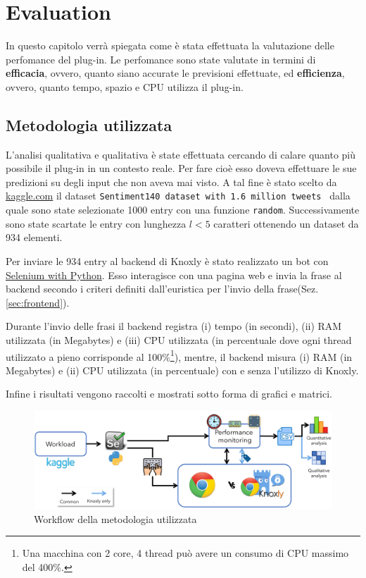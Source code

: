 \chapter{Evaluation}
\label{ch:cap6}
In questo capitolo verrà spiegata come è stata effettuata la valutazione delle perfomance del plug-in. Le perfomance sono state valutate in termini di \textbf{efficacia}, ovvero, quanto siano accurate le previsioni effettuate, ed \textbf{efficienza}, ovvero, quanto tempo, spazio e CPU utilizza il plug-in.   

\section{Metodologia utilizzata}
\label{sec:metodologiaevaluation}
L'analisi qualitativa e qualitativa è state effettuata cercando di calare quanto più possibile il plug-in in un contesto reale. Per fare cioè esso doveva effettuare le sue predizioni su degli input che non aveva mai visto. A tal fine è stato scelto da \href{https://www.kaggle.com/}{kaggle.com} il dataset {\tt Sentiment140 dataset with 1.6 million tweets }\cite{sentiment140} dalla quale sono state selezionate 1000 entry con una funzione {\tt random}. Successivamente sono state scartate le entry con lunghezza $l<5$ caratteri ottenendo un dataset da 934 elementi.

Per inviare le 934 entry al backend di Knoxly è stato realizzato un bot con \href{https://selenium-python.readthedocs.io/}{Selenium with Python}. Esso interagisce con una pagina web e invia la frase al backend secondo i criteri definiti  dall'euristica per l'invio della frase(Sez. \ref{sec:frontend}).

Durante l'invio delle frasi il backend registra (i) tempo (in secondi), (ii) RAM utilizzata (in Megabytes) e (iii) CPU utilizzata (in percentuale dove ogni thread utilizzato a pieno corrisponde al 100\%\footnote{Una macchina con 2 core, 4 thread può avere un consumo di CPU massimo del 400\%.}), mentre, il backend misura (i) RAM (in Megabytes) e (ii) CPU utilizzata (in percentuale) con e senza l'utilizzo di Knoxly.

Infine i risultati vengono raccolti e mostrati sotto forma di grafici e matrici.

\begin{figure}[h!t]
    \centering
    \includegraphics[width=15cm]{Figure/grafici/evaluation_cropped.pdf}
    \caption{Workflow della metodologia utilizzata}
    \label{fig:methodeval}
\end{figure}
\FloatBarrier

